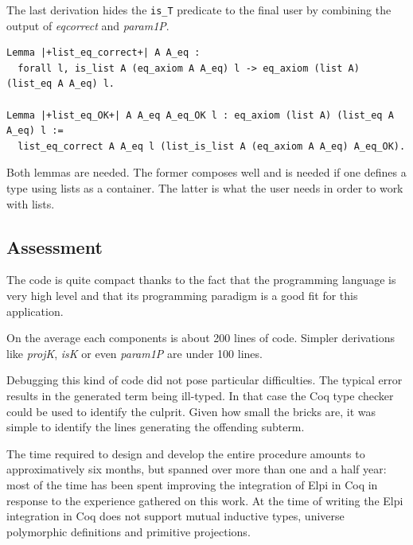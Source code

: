 \documentclass[a4paper,UKenglish,cleveref, autoref]{lipics-v2019}
\newcommand{\derive}[1]{\emph{#1}}
\begin{document}
The last derivation hides the \lstinline+is_T+ predicate
to the final user by combining the output of
\derive{eqcorrect} and \derive{param1P}.

\begin{lstlisting}
Lemma |+list_eq_correct+| A A_eq :
  forall l, is_list A (eq_axiom A A_eq) l -> eq_axiom (list A) (list_eq A A_eq) l.

Lemma |+list_eq_OK+| A A_eq A_eq_OK l : eq_axiom (list A) (list_eq A A_eq) l :=
  list_eq_correct A A_eq l (list_is_list A (eq_axiom A A_eq) A_eq_OK).
\end{lstlisting}

\noindent
Both lemmas are needed. The former composes well
and is needed if one defines a type using lists as a container.
The latter is what the user needs in order to work with lists.

\subsection{Assessment} %

The code is quite compact thanks to the fact that the programming
language is very high level and that its programming paradigm is a good
fit for this application.

On the average each components is about 200 lines of code.
Simpler derivations like \derive{projK}, \derive{isK} or even
\derive{param1P} are under 100 lines.

Debugging this kind of code did not pose particular difficulties.
The typical error results in the generated term being ill-typed.
In that case the Coq type checker could be used to identify the
culprit. Given how small the bricks are, it was simple to identify
the lines generating the offending subterm.

The time required to design and develop the entire procedure amounts
to approximatively six months, but spanned over more than one and a
half year: most of the time has been spent improving the integration
of Elpi in Coq in response to the experience gathered on this work.
At the time of writing the Elpi integration in Coq does not support
mutual inductive types, universe polymorphic definitions and primitive
projections.
\end{document}
